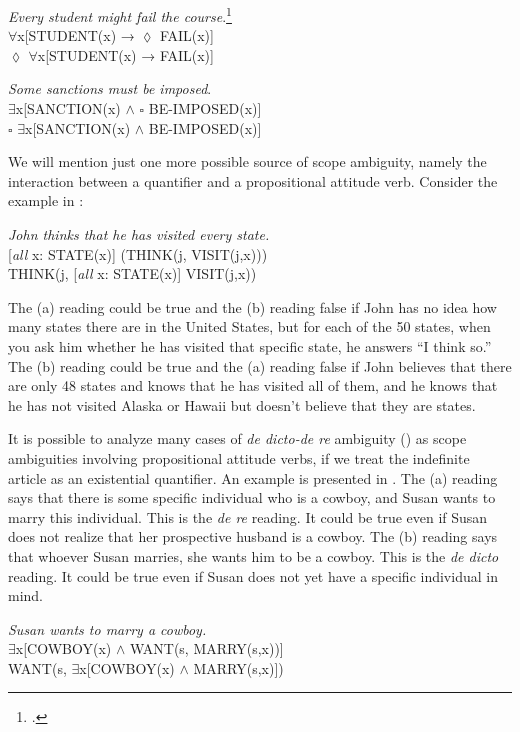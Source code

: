 \ea \label{ex:14.37}
\textit{Every student might fail the course}.\footnote{\citet[48]{Abbott2010}.}\\
\ea ${\forall}$x[STUDENT(x) → ${\lozenge}$ FAIL(x)]\\
\ex ${\lozenge}$ ${\forall}$x[STUDENT(x) → FAIL(x)]
\z \z

\ea \label{ex:14.38}
\textit{Some sanctions must be imposed}.\\
\ea ${\exists}$x[SANCTION(x) $\wedge$ ${\square}$ BE-IMPOSED(x)]\\
\ex ${\square}$ ${\exists}$x[SANCTION(x) $\wedge$ BE-IMPOSED(x)]
\z \z


We will mention just one more possible source of scope ambiguity, namely the interaction between a quantifier and a propositional attitude verb. Consider the example in :


\ea \label{ex:14.39}
\textit{John thinks that he has visited every state.}\\
\ea \label{ex:14.}  [\textit{all} x: STATE(x)] (THINK(j, VISIT(j,x)))\\
\ex  THINK(j, [\textit{all} x: STATE(x)] VISIT(j,x))
                       \z
\z


The (a) reading could be true and the (b) reading false if John has no idea how many states there are in the United States, but for each of the 50 states, when you ask him whether he has visited that specific state, he answers “I think so.” The (b) reading could be true and the (a) reading false if John believes that there are only 48 states and knows that he has visited all of them, and he knows that he has not visited Alaska or Hawaii but doesn’t believe that they are states.



It is possible to analyze many cases of \textit{de dicto-de re} ambiguity () as scope ambiguities involving propositional attitude verbs, if we treat the indefinite article as an existential quantifier. An example is presented in . The (a) reading says that there is some specific individual who is a cowboy, and Susan wants to marry this individual. This is the \textit{de re} reading. It could be true even if Susan does not realize that her prospective husband is a cowboy. The (b) reading says that whoever Susan marries, she wants him to be a cowboy. This is the \textit{de dicto} reading. It could be true even if Susan does not yet have a specific individual in mind.


\ea \label{ex:14.40}
\textit{Susan wants to marry a cowboy.}\\
\ea  ${\exists}$x[COWBOY(x) $\wedge$ WANT(s, MARRY(s,x))]\\
\ex  WANT(s, ${\exists}$x[COWBOY(x) $\wedge$ MARRY(s,x)])
                       \z
\z


